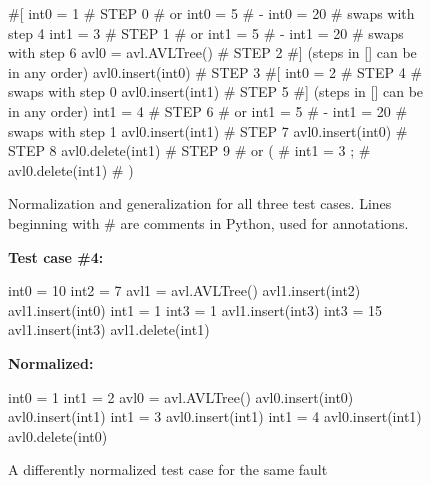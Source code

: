 \begin{figure}
{\scriptsize
\begin{code}
\textcolor{black!45}{\#[}
int0 = 1                              \textcolor{black!45}{\# STEP 0}
\textcolor{black!45}{\#  or int0 = 5 }
\textcolor{black!45}{\#   - int0 = 20} 
\textcolor{black!45}{\#  swaps with step 4}
int1 = 3                              \textcolor{black!45}{\# STEP 1}
\textcolor{black!45}{\#  or int1 = 5 }
\textcolor{black!45}{\#   - int1 = 20} 
\textcolor{black!45}{\#  swaps with step 6}
avl0 = avl.AVLTree()                  \textcolor{black!45}{\# STEP 2}
\textcolor{black!45}{\#] (steps in [] can be in any order)}
avl0.insert(int0)                     \textcolor{black!45}{\# STEP 3}
\textcolor{black!45}{\#[}
int0 = 2                              \textcolor{black!45}{\# STEP 4}
\textcolor{black!45}{\#  swaps with step 0}
avl0.insert(int1)                     \textcolor{black!45}{\# STEP 5}
\textcolor{black!45}{\#] (steps in [] can be in any order)}
int1 = 4                              \textcolor{black!45}{\# STEP 6}
\textcolor{black!45}{\#  or int1 = 5 }
\textcolor{black!45}{\#   - int1 = 20} 
\textcolor{black!45}{\#  swaps with step 1}
avl0.insert(int1)                     \textcolor{black!45}{\# STEP 7}
avl0.insert(int0)                     \textcolor{black!45}{\# STEP 8}
avl0.delete(int1)                     \textcolor{black!45}{\# STEP 9}
\textcolor{black!45}{\#  or (}
\textcolor{black!45}{\#      int1 = 3  ;}
\textcolor{black!45}{\#      avl0.delete(int1) }
\textcolor{black!45}{\#     )}
\end{code}
}
\caption{Normalization and generalization for all three test cases.
  Lines beginning with \# are comments in Python, used for annotations.}
\label{normalgen}
\end{figure}

\begin{figure}
{\scriptsize
{\bf Test case \#4:}
\begin{code}
int0 = 10 
int2 = 7 
avl1 = avl.AVLTree() 
avl1.insert(int2) 
avl1.insert(int0) 
int1 = 1 
int3 = 1 
avl1.insert(int3) 
int3 = 15 
avl1.insert(int3) 
avl1.delete(int1) 
\end{code}
{\bf Normalized:}
\begin{code}
int0 = 1
int1 = 2
avl0 = avl.AVLTree()
avl0.insert(int0) 
avl0.insert(int1) 
int1 = 3  
avl0.insert(int1) 
int1 = 4  
avl0.insert(int1)  
avl0.delete(int0) 
\end{code}
}
\caption{A differently normalized test case for the same fault}
\label{diffnorm}
\end{figure}
